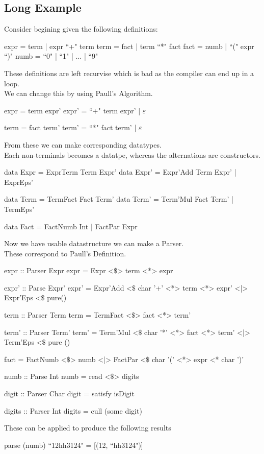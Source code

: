 \documentclass[11pt,a4paper]{article}
\begin{document}
\subsection{Long Example}
Consider begining given the following definitions:
\begin{code}
expr = term | expr ``+" term
term = fact | term ``*" fact
fact = numb | ``(" expr ``)"
numb = ``0" | ``1" | $\dots$ | ``9"
\end{code}
These definitions are left recurvise which is bad as the compiler can end up in a loop.\\
We can change this by using Paull's Algorithm.
\begin{code}
expr = term expr'
expr' = ``+" term expr' | $\varepsilon$

term = fact term'
term' = ``*" fact term' | $\varepsilon$
\end{code}
From these we can make corresponding datatypes.\\
Each non-terminals becomes a datatpe, whereas the alternations are constructors.
\begin{code}
data Expr  = ExprTerm Term Expr'
data Expr' = Expr'Add Term Expr' | ExprEps'

data Term  = TermFact Fact Term'
data Term' = Term'Mul Fact Term' | TermEps'

data Fact = FactNumb Int | FactPar Expr
\end{code}
Now we have usable datastructure we can make a Parser.\\
These correspond to Paull's Definition.
\begin{code}
expr :: Parser Expr
expr = Expr <$\mathdollar$> term <*> expr

expr' :: Parse Expr'
expr' = Expr'Add <$\mathdollar$ char '+' <*> term <*> expr'
    <|> Expr'Eps <$\mathdollar$ pure()

term :: Parser Term
term = TermFact <$\mathdollar$> fact <*> term'

term' :: Parser Term'
term' = Term'Mul <$\mathdollar$ char '*' <*> fact <*> term'
    <|> Term'Eps <$\mathdollar$ pure ()

fact = FactNumb <$\mathdollar$> numb
   <|> FactPar <$\mathdollar$ char '(' <*> expr <* char ')'

numb :: Parse Int
numb = read <$\mathdollar$> digits

digit :: Parser Char
digit = satisfy isDigit

digits :: Parser Int
digits = cull (some digit)
\end{code}
These can be applied to produce the following results
\begin{code}
parse (numb) ``12hh3124" = [(12, ``hh3124")]
\end{code}
\end{document}
